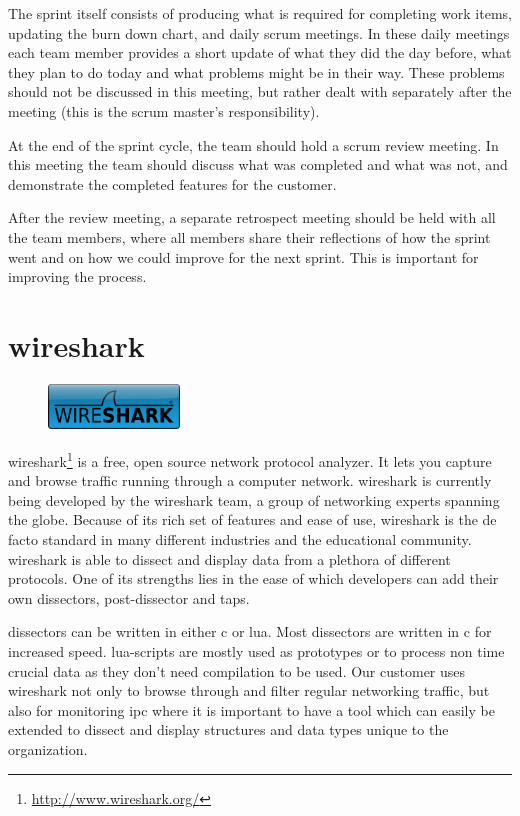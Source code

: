 The sprint itself consists of producing what is required for completing work
items, updating the burn down chart, and daily \Gls{scrum} meetings. In these daily
meetings each team member provides a short update of what they did the day
before, what they plan to do today and what problems might be in their way.
These problems should not be discussed in this meeting, but rather dealt with
separately after the meeting (this is the \Gls{scrum} master's responsibility).

At the end of the sprint cycle, the team should hold a \Gls{scrum} review meeting.
In this meeting the team should discuss what was completed and what was not, and
demonstrate the completed features for the customer.	

After the review meeting, a separate retrospect meeting should be held with all
the team members, where all members share their reflections of how the sprint
went and on how we could improve for the next sprint. This is important for improving the
process.


\section{\Gls{wireshark}}
\label{sec:pre:wireshark}
\begin{figure}
	\vspace{-10pt}
	\includegraphics[width=3.5cm]{./planning/img/wireshark_logo}
	\vspace{-20pt}
\end{figure}
\Gls{wireshark}\footnote{\url{http://www.wireshark.org/}} is a free, open source
network \gls{protocol} analyzer. It lets you capture and browse traffic running
through a computer network. \Gls{wireshark} is currently being developed by the
\Gls{wireshark} team, a group of networking experts spanning the globe.\cite{WiresharkORG} Because of
its rich set of features and ease of use, \Gls{wireshark} is the de facto standard in
many different industries and the educational community. \Gls{wireshark} is able to
dissect and display data from a plethora of different \glspl{protocol}. One of its
strengths lies in the ease of which developers can add their own \glspl{dissector},
\gls{post-dissector} and taps.

\Glspl{dissector} can be written in either \Gls{c} or \Gls{lua}. Most \glspl{dissector} are written in \Gls{c}
for increased speed. \Gls{lua}-scripts are mostly used as prototypes or to process
non time crucial data as they don't need compilation to be used. Our customer
uses \Gls{wireshark} not only to browse through and filter regular networking
traffic, but also for monitoring \gls{ipc} where it is
important to have a tool which can easily be extended to dissect and display
structures and data types unique to the organization.

